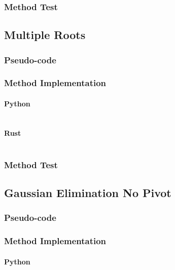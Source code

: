 \documentclass{article}
\begin{document}
        \subsubsection{Method Test}

    \subsection{Multiple Roots}
        \subsubsection{Pseudo-code}
        \subsubsection{Method Implementation}
            \paragraph{Python}
                \begin{verbatim}
                \end{verbatim}
            \paragraph{Rust}
                \begin{verbatim}
                \end{verbatim}
        \subsubsection{Method Test}

    \subsection{Gaussian Elimination No Pivot}
        \subsubsection{Pseudo-code}
        \subsubsection{Method Implementation}
            \paragraph{Python}
                \begin{verbatim}
                \end{verbatim}
\end{document}
